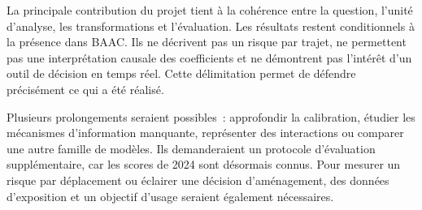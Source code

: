 La principale contribution du projet tient à la cohérence entre la question,
l'unité d'analyse, les transformations et l'évaluation. Les résultats restent
conditionnels à la présence dans BAAC. Ils ne décrivent pas un risque par trajet,
ne permettent pas une interprétation causale des coefficients et ne démontrent
pas l'intérêt d'un outil de décision en temps réel. Cette délimitation permet
de défendre précisément ce qui a été réalisé.

Plusieurs prolongements seraient possibles~: approfondir la calibration, étudier les
mécanismes d'information manquante, représenter des interactions ou comparer une
autre famille de modèles. Ils demanderaient un protocole d'évaluation supplémentaire,
car les scores de 2024 sont désormais connus. Pour mesurer un risque par déplacement
ou éclairer une décision d'aménagement, des données d'exposition et un objectif
d'usage seraient également nécessaires.

